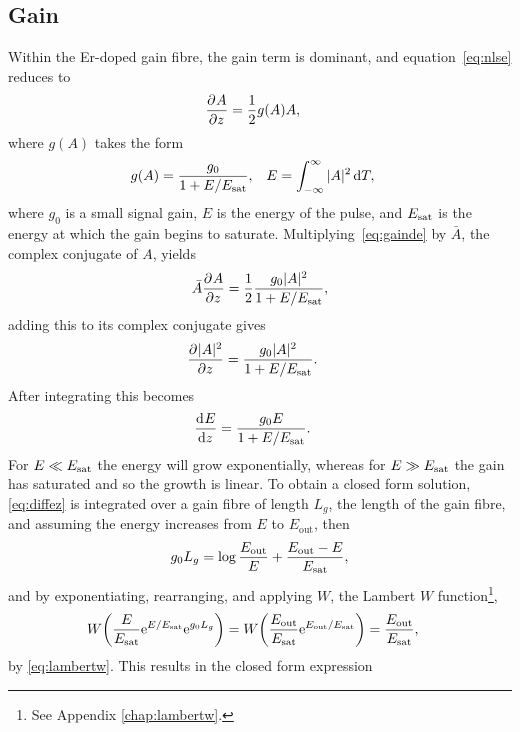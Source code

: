 \subsection{Gain}
\label{chap:gain}
Within the Er-doped gain fibre, the gain term is dominant, and equation~\eqref{eq:nlse} reduces to
\begin{align}
\label{eq:gainde}
\frac{\partial^{}A}{\partial{z}^{}} &= \frac{1}{2} g(A) A,
\end{align}
where $g(A)$ takes the form \cite{bohun, burgoyne2014, hausbook, haus1975, haus1991, haus1992, haus2000, kartner, peng, shtyrina, silfvast, usechak, yarutkina}
\begin{align}
\label{eq:energy}
	g(A) &= \frac{g_0}{1 + E / E_{\textrm{sat}}},& E &= \int_{-\infty}^\infty |A|^2 \, \textrm{d} T,
\end{align}
where $g_0$ is a small signal gain, $E$ is the energy of the pulse, and $E_{\textrm{sat}}$ is the energy at which the gain begins to saturate.
Multiplying~\eqref{eq:gainde} by $\bar{A}$, the complex conjugate of $A$, yields
\begin{align*}
	\bar{A} \frac{\partial^{}A}{\partial{z}^{}} = \frac{1}{2}\frac{g_0 |A|^2}{1 + E / E_{\textrm{sat}}},
\end{align*}
adding this to its complex conjugate gives
\begin{align}
\frac{\partial^{}|A|^2}{\partial{z}^{}} &= \frac{g_0 |A|^2}{1 + E / E_{\textrm{sat}}}.
\label{eq:diffea}
\end{align}
After integrating this becomes
\begin{align}
\frac{\textrm{d}^{}E}{\textrm{d}{z}^{}} &= \frac{g_0 E}{1 + E / E_{\textrm{sat}}}.
\label{eq:diffez}
\end{align}
For $E \ll E_{\textrm{sat}}$ the energy will grow exponentially, whereas for $E \gg E_{\textrm{sat}}$ the gain has saturated and so the growth is linear. To obtain a closed form solution, \eqref{eq:diffez} is integrated over a gain fibre of length $L_g$, the length of the gain fibre, and assuming the energy increases from $E$ to $E_{\textrm{out}}$, then
\begin{align*}
	g_0 L_g = \log\frac{E_{\textrm{out}}}{E} + \frac{E_{\textrm{out}}-E}{E_{\textrm{sat}}},
\end{align*}
and by exponentiating, rearranging, and applying $W$, the Lambert $W$ function\footnote{See Appendix \ref{chap:lambertw}.},
\begin{align*}
W \left(\frac{E}{\Es} \textrm{e}^{E/\Es} \textrm{e}^{g_0 L_g}\right) &= W\left(\frac{E_{\textrm{out}}}{\Es} \textrm{e}^{E_{\textrm{out}}/\Es}\right) = \frac{E_{\textrm{out}}}{\Es},
\end{align*}
by \eqref{eq:lambertw}. This results in the closed form expression

